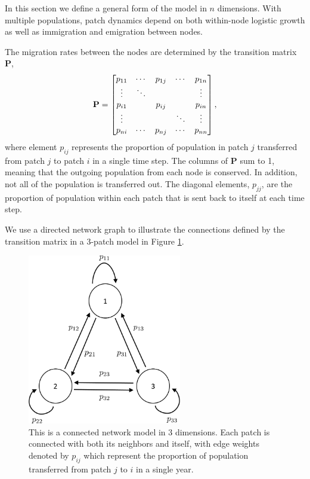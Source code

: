 \documentclass[12pt, openany]{book}
\theoremstyle{definition}
\theoremstyle{remark}
\numberwithin{equation}{chapter}
\numberwithin{figure}{chapter}
\begin{document}
In this section we define a general form of the model in $n$ dimensions. With multiple populations, patch dynamics depend on both within-node logistic growth as well as immigration and emigration between nodes. 

The migration rates between the nodes are determined by the transition matrix $\textbf{P}$,
\begin{equation}\label{transtionmatrix}
\bf{P} =
\begin{bmatrix}
p_{11} & \cdots & p_{1j} & \cdots & p_{1n} \\
\vdots & \ddots & {}     & {}     & \vdots \\
p_{i1} & {}     & p_{ij} & {}     & p_{in} \\
\vdots & {}     & {}     & \ddots & \vdots \\
p_{ni} & \cdots & p_{nj} & \cdots & p_{nn}
\end{bmatrix},
\end{equation}
where element $p_{ij}$ represents the proportion of population in patch $j$ transferred from patch $j$ to patch $i$ in a single time step. The columns of $\textbf{P}$ sum to 1, meaning that the outgoing population from each node is conserved. In addition, not all of the population is transferred out. The diagonal elements, $p_{jj}$, are the proportion of population within each patch that is sent back to itself at each time step.

We use a directed network graph to illustrate the connections defined by the transition matrix in a 3-patch model in Figure \ref{fig1}.

\begin{figure}[t!]
\begin{center}
       \includegraphics[width=0.6\textwidth]{network1.png}
       \caption{This is a connected network model in 3 dimensions. Each patch is connected with both its neighbors and itself, with edge weights denoted by $p_{ij}$ which represent the proportion of population transferred from patch $j$ to $i$ in a single year. \label{fig1}}
\end{center}
\end{figure}
\end{document}
